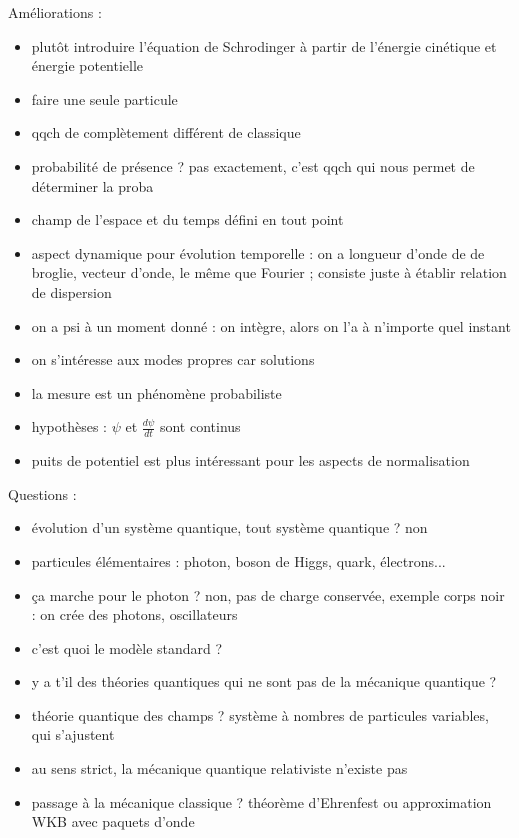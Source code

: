 \begin{remarques} 
Améliorations : 
\begin{itemize} 
\item plutôt introduire l'équation de Schrodinger à partir de l'énergie cinétique et énergie potentielle 
\item faire une seule particule
\item qqch de complètement différent de classique
\item probabilité de présence ? pas exactement, c'est qqch qui nous permet de déterminer la proba
\item champ de l'espace et du temps défini en tout point
\item aspect dynamique pour évolution temporelle : on a longueur d'onde de de broglie, vecteur d'onde, le même que Fourier ; consiste juste à établir relation de dispersion
\item on a psi à un moment donné : on intègre, alors on l'a à n'importe quel instant
\item on s'intéresse aux modes propres car solutions
\item la mesure est un phénomène probabiliste
\item hypothèses : $\psi$ et $\frac{d \psi}{dt}$ sont continus
\item puits de potentiel est plus intéressant pour les aspects de normalisation
\end{itemize}

Questions :
\begin{itemize} 
\item évolution d'un système quantique, tout système quantique ?   non
\item particules élémentaires : photon, boson de Higgs, quark, électrons... 
\item ça marche pour le photon ? non, pas de charge conservée, exemple corps noir : on crée des photons, oscillateurs
\item c'est quoi le modèle standard ? 
\item y a t'il des théories quantiques qui ne sont pas de la mécanique quantique ?
\item théorie quantique des champs ? système à nombres de particules variables, qui s'ajustent
\item au sens strict, la mécanique quantique relativiste n'existe pas 
\item passage à la mécanique classique ? théorème d'Ehrenfest ou approximation WKB avec paquets d'onde
\end{itemize} \end{remarques}